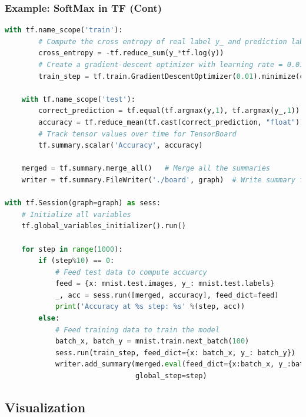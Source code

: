 \begin{frame}[fragile]
  \MyLogo
  \frametitle{Example: SoftMax in TF (Cont)}  

\ContinueLineNumber
\begin{lstlisting}[language=python]
	with tf.name_scope('train'):
		# Compute the cross entropy of real label y_ and prediction label y
		cross_entropy = -tf.reduce_sum(y_*tf.log(y))
		# Create a gradient-descent optimizer with learning rate = 0.01
		train_step = tf.train.GradientDescentOptimizer(0.01).minimize(cross_entropy)

	with tf.name_scope('test'):
		correct_prediction = tf.equal(tf.argmax(y,1), tf.argmax(y_,1))
		accuracy = tf.reduce_mean(tf.cast(correct_prediction, "float"))
		# Track tensor values over time for TensorBoard
		tf.summary.scalar('Accuracy', accuracy)
	
	merged = tf.summary.merge_all()   # Merge all the summaries
	writer = tf.summary.FileWriter('./board', graph)  # Write summary file to ./board
	
with tf.Session(graph=graph) as sess:
	# Initialize all variables
	tf.global_variables_initializer().run()
	
	for step in range(1000):
		if (step%10) == 0:
			# Feed test data to compute accuarcy
			feed = {x: mnist.test.images, y_: mnist.test.labels}
			_, acc = sess.run([merged, accuracy], feed_dict=feed)
			print('Accuracy at %s step: %s' %(step, acc))
		else:
			# Feed training data to train the model
			batch_x, batch_y = mnist.train.next_batch(100)
			sess.run(train_step, feed_dict={x: batch_x, y_: batch_y})
			writer.add_summary(merged.eval(feed_dict={x:batch_x, y_:batch}),
							   global_step=step)
\end{lstlisting}

\end{frame}

\subsection{Visualization}

